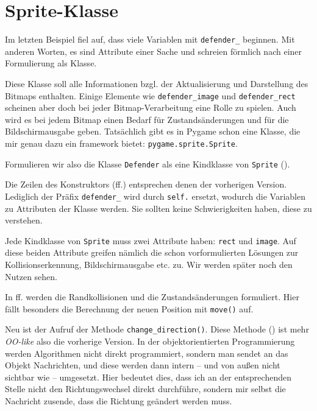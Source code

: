 \newpage
\section{Sprite-Klasse}
Im letzten Beispiel fiel auf, dass viele Variablen mit \texttt{defender\_} beginnen. Mit anderen Worten, es sind Attribute einer Sache und schreien förmlich nach einer Formulierung als Klasse. 

Diese Klasse soll alle Informationen bzgl. der Aktualisierung und Darstellung des Bitmaps enthalten. Einige Elemente wie \texttt{defender\_image} und \texttt{defender\_rect} scheinen aber doch bei jeder Bitmap-Verarbeitung eine Rolle zu spielen. Auch wird es bei jedem Bitmap einen Bedarf für Zustandsänderungen und für die Bildschirmausgabe geben. Tatsächlich gibt es in Pygame schon eine Klasse, die mir genau dazu ein \Gls{framework} bietet: \texttt{pygame.sprite.Sprite}. 

Formulieren wir also die Klasse \texttt{Defender} als eine Kindklasse von \texttt{Sprite} ().


Die Zeilen des Konstruktors (ff.) entsprechen denen der vorherigen Version. Lediglich der Präfix \texttt{defender\_} wird durch \texttt{self.} ersetzt, wodurch die Variablen zu Attributen der Klasse werden. Sie sollten keine Schwierigkeiten haben, diese zu verstehen.

Jede Kindklasse von \texttt{Sprite} muss zwei Attribute haben: \texttt{rect} und \texttt{image}. Auf diese beiden Attribute greifen nämlich die schon vorformulierten Lösungen zur Kollisionserkennung, Bildschirmausgabe etc. zu. Wir werden später noch den Nutzen sehen.

In ff. werden die Randkollisionen und die Zustandsänderungen formuliert. Hier fällt besonders die Berechnung der neuen Position mit \texttt{move()} auf. 

Neu ist der Aufruf der Methode \texttt{change\_direction()}. Diese Methode () ist mehr \emph{OO-like} also die vorherige Version. In der objektorientierten Programmierung werden Algorithmen nicht direkt programmiert, sondern man sendet an das Objekt Nachrichten, und diese werden dann intern -- und von außen nicht sichtbar wie -- umgesetzt. Hier bedeutet dies, dass ich an der entsprechenden Stelle nicht den Richtungswechsel direkt durchführe, sondern mir selbst die Nachricht zusende, dass die Richtung geändert werden muss. 

